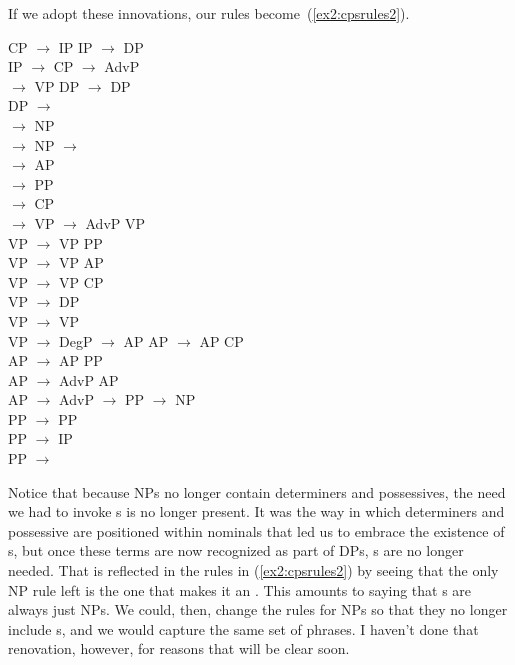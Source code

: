 If we adopt these innovations, our rules become~(\ref{ex2:cpsrules2}).
\begin{exe}
	\raggedright
	\ex \label{ex2:cpsrules2} 
	\begin{xlist}
		\ex CP $\rightarrow$  IP
		\ex IP $\rightarrow$ 
		DP \\ 
		IP $\rightarrow$ CP 
		\ex 
		 $\rightarrow$ AdvP \\ 
		 $\rightarrow$  VP
		\ex
		DP $\rightarrow$ DP \\
		DP $\rightarrow$ \\
		 $\rightarrow$  NP\\
		 $\rightarrow$ 
		\ex 
	NP $\rightarrow$ \\
	\ex
	 $\rightarrow$ AP \\
	 $\rightarrow$  PP\\
	 $\rightarrow$  CP\\
	 $\rightarrow$ 
	\ex
	VP $\rightarrow$ AdvP VP\\
	VP $\rightarrow$ VP PP\\
	VP $\rightarrow$ VP AP\\
	VP $\rightarrow$ VP CP\\
	VP $\rightarrow$  DP\\
	VP $\rightarrow$  VP\\
	VP $\rightarrow$ 
	\ex
	DegP $\rightarrow$  AP
	\ex
	AP $\rightarrow$ AP CP\\
	AP $\rightarrow$ AP PP\\
	AP $\rightarrow$ AdvP AP\\
	AP $\rightarrow$ 
	\ex
	AdvP $\rightarrow$ 
	\ex 
	PP $\rightarrow$  NP\\
	PP $\rightarrow$  PP\\
	PP $\rightarrow$  IP\\
	PP $\rightarrow$ 
	\end{xlist}
\end{exe}
Notice that because NPs no longer contain determiners and possessives, the need we had to invoke s is no longer present. It was the way in which determiners and possessive are positioned within nominals that led us to embrace the existence of s, but once these terms are now recognized as part of DPs, s are no longer needed. That is reflected in the rules in (\ref{ex2:cpsrules2}) by seeing that the only NP rule left is the one that makes it an . This amounts to saying that s are always just NPs. We could, then, change the rules for NPs so that they no longer include s, and we would capture the same set of phrases. I haven't done that renovation, however, for reasons that will be clear soon.

